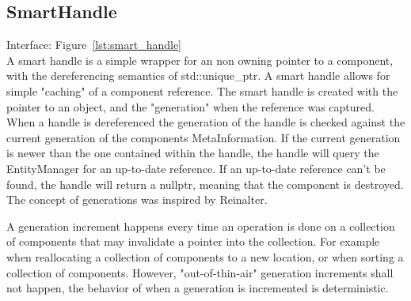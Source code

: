 \subsection{SmartHandle}
Interface: Figure~\ref{lst:smart_handle}\\\noindent
A smart handle is a simple wrapper for an non owning pointer to a component, with the dereferencing semantics of std::unique\_ptr. 
A smart handle allows for simple "caching" of a component reference.
The smart handle is created with the pointer to an object, 
and the "generation" when the reference was captured. 
When a handle is dereferenced the generation of the handle is checked against the current generation of the components MetaInformation. 
If the current generation is newer than the one contained within the handle, 
the handle will query the EntityManager for an up-to-date reference.
If an up-to-date reference can't be found, 
the handle will return a nullptr, meaning that the component is destroyed.
The concept of generations was inspired by Reinalter\cite{molecular_musings_internal_references}.

A generation increment happens every time an operation is done on a collection of components that may invalidate a pointer into the collection.
For example when reallocating a collection of components to a new location,
or when sorting a collection of components.
However, "out-of-thin-air" generation increments shall not happen, the behavior of when a generation is incremented is deterministic.
